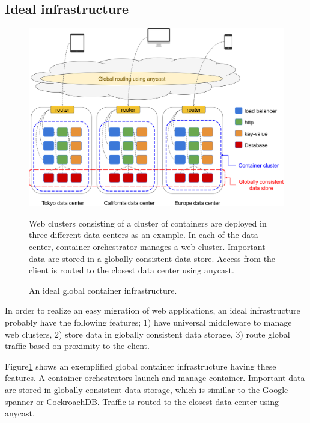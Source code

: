 \subsection{Ideal infrastructure}

\begin{figure}[h]
\begin{center}
\includegraphics[width=0.9\columnwidth]{Figs/global_container_infrastructure}
\end{center}
\caption{
An ideal global container infrastructure.
}
\centering\parbox[c]{0.9\columnwidth}{
Web clusters consisting of a cluster of containers are deployed in three different data centers as an example.
In each of the data center, container orchestrator manages a web cluster. 
Important data are stored in a globally consistent data store.  
Access from the client is routed to the closest data center using anycast.
}
\label{fig:global_container_infrastructure}
\end{figure}

In order to realize an easy migration of web applications, an ideal infrastructure probably have the following features;
1) have universal middleware to manage web clusters,
2) store data in globally consistent data storage,
3) route global traffic based on proximity to the client.

Figure\ref{fig:global_container_infrastructure} shows an exemplified global container infrastructure having these features.
A container orchestrators launch and manage container.
Important data are stored in globally consistent data storage, which is simillar to the Google spanner\cite{Corbett:2013:SGG:2518037.2491245,Cooper:2013:SGG:2485732.2485756} or CockroachDB\cite{pavlo2016s}.
Traffic is routed to the closest data center using anycast\cite{rfc1546}.

